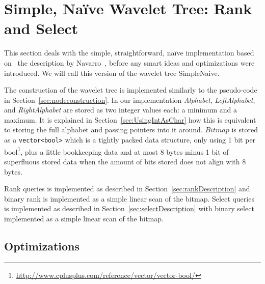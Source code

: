 \section{Simple, Naïve Wavelet Tree: Rank and Select}
This section deals with the simple, straightforward, naïve implementation based on ~the description by Navarro~, before any smart ideas and optimizations were introduced.
We will call this version of the wavelet tree SimpleNaive.

The construction of the wavelet tree is implemented similarly to the pseudo-code in Section~\ref{sec:nodeconstruction}.
In our implementation \textit{Alphabet}, \textit{LeftAlphabet}, and \textit{RightAlphabet} are stored as two integer values each: a minimum and a maximum.
It is explained in Section~\ref{sec:UsingIntAsChar} how this is equivalent to storing the full alphabet and passing pointers into it around.
$Bitmap$ is stored as a \texttt{vector<bool>} which is a tightly packed data structure, only using 1 bit per bool\footnote{\url{http://www.cplusplus.com/reference/vector/vector-bool/}}, plus a little bookkeeping data and at most 8 bytes minus 1 bit of superfluous stored data when the amount of bits stored does not align with 8 bytes.

Rank queries is implemented as described in Section~\ref{sec:rankDescription} and
binary rank is implemented as a simple linear scan of the bitmap.
Select queries is implemented as described in Section~\ref{sec:selectDescription} with binary select implemented as a simple linear scan of the bitmap.

\subsection{Optimizations}
\label{sec:simpleoptimizations}
